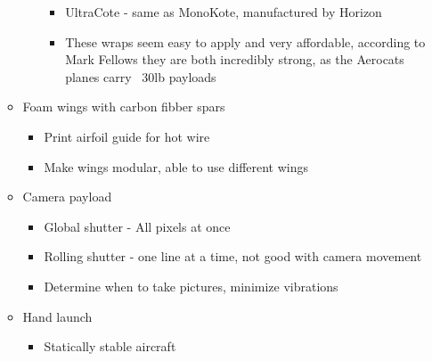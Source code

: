 \documentclass{article}
\begin{document}
\begin{spacing}{1.1}
\begin{itemize}
\begin{itemize}
\begin{itemize}
\begin{itemize}
				\item UltraCote - same as MonoKote, manufactured by Horizon
				\item These wraps seem easy to apply and very affordable, according to Mark Fellows they are both incredibly strong, as the Aerocats planes carry ~30lb payloads
			\end{itemize}
		\end{itemize}
		\item Foam wings with carbon fibber spars
		\begin{itemize}
			\item Print airfoil guide for hot wire
			\item Make wings modular, able to use different wings
		\end{itemize}
		\item Camera payload
		\begin{itemize}
			\item Global shutter - All pixels at once
			\item Rolling shutter - one line at a time, not good with camera movement
			\item Determine when to take pictures, minimize vibrations
		\end{itemize}
		\item Hand launch
		\begin{itemize}
			\item Statically stable aircraft
		\end{itemize}
	\end{itemize}
\end{itemize}

\end{spacing}
\end{document}
